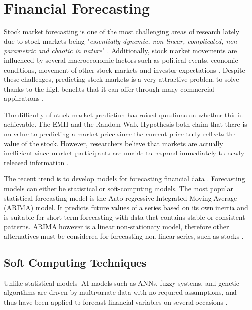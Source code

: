 \documentclass{UoYCSproject}
\begin{document}
\section{Financial Forecasting}
Stock market forecasting is one of the most challenging areas of research lately due to stock markets being "\textit{essentially dynamic, non-linear, complicated, non-parametric and chaotic in nature}" \cite{tan2005brain}. Additionally, stock market movements are influenced by several macroeconomic factors such as political events, economic conditions, movement of other stock markets and investor expectations \cite{zhang2009stock}. Despite these challenges, predicting stock markets is a very attractive problem to solve thanks to the high benefits that it can offer through many commercial applications \cite{majhi2007stock}. 

The difficulty of stock market prediction has raised questions on whether this is achievable. The EMH and the Random-Walk Hypothesis both claim that there is no value to predicting a market price since the current price truly reflects the value of the stock. However, researchers believe that markets are actually inefficient since market participants are unable to respond immediately to newly released information \cite{jensen1978some}. 

The recent trend is to develop models for forecasting financial data \cite{majhi2007stock}. Forecasting models can either be statistical or soft-computing models. The most popular statistical forecasting model is the Auto-regressive Integrated Moving Average (ARIMA) model. It predicts future values of a series based on its own inertia and is suitable for short-term forecasting with data that contains stable or consistent patterns. ARIMA however is a linear non-stationary model, therefore other alternatives must be considered for forecasting non-linear series, such as stocks \cite{wang1996stock}. 

\subsection{Soft Computing Techniques}
Unlike statistical models, AI models such as ANNs, fuzzy systems, and genetic algorithms are driven by multivariate data with no required assumptions, and thus have been applied to forecast financial variables on several occasions \cite{zhong2017forecasting}. 
\end{document}
